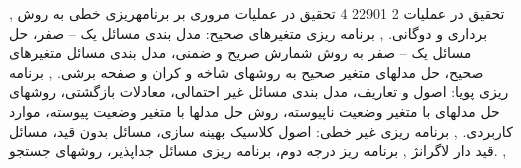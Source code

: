 \documentclass[class=article, crop=false]{standalone}
\begin{document}
{{{{        }}
        },{{
            تحقیق در عملیات 2
        }{
            22901
        }{
            4
        }{
            تحقیق در عملیات
        }{}{{
            مروری بر برنامهریزی خطی به روش برداری و دوگانی.
            ,
            برنامه ریزی متغیرهای صحیح: مدل بندی مسائل یک – صفر، حل مسائل یک – صفر به روش شمارش صریح و ضمنی، مدل بندی مسائل متغیرهای صحیح، حل مدلهای متغیر صحیح به روشهای شاخه و کران و صفحه برشی.
            ,
            برنامه ریزی پویا: اصول و تعاریف، مدل بندی مسائل غیر احتمالی، معادلات بازگشتی، روشهای حل مدلهای با متغیر وضعیت ناپیوسته، روش حل مدلها با متغیر وضعیت پیوسته، موارد کاربردی.
            ,
            برنامه ریزی غیر خطی: اصول کلاسیک بهینه سازی، مسائل بدون قید، مسائل قید دار لاگرانژ
            ,
            برنامه ریز درجه دوم، برنامه ریزی مسائل جداپذیر، روشهای جستجو.
            ,
        }}
        }
    }
\end{document}
